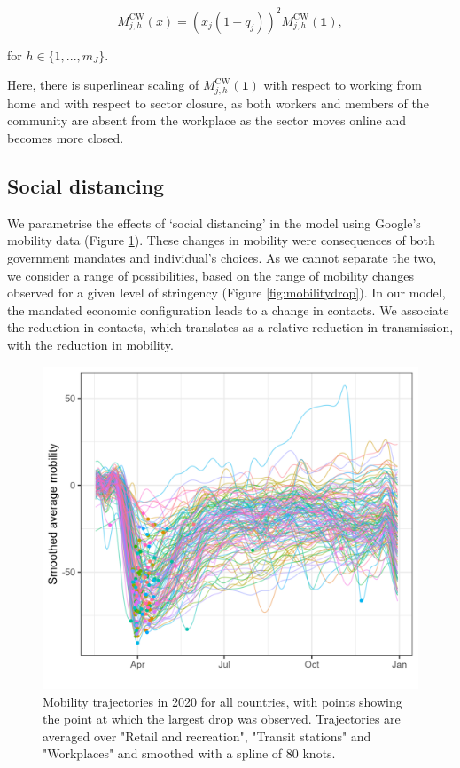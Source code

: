 \documentclass[
]{article}
\begin{document}
\begin{equation}
M_{j,h}^{\text{CW}}(x) = (x_{j}(1-q_j))^2M_{j,h}^{\text{CW}}(\textbf{1}),
\label{eq:ctow}
\end{equation}

for \(h\in\{1,...,m_J\}\).

Here, there is superlinear scaling of \(M^{\text{CW}}_{j,h}(\textbf{1})\) with respect to working from home and with respect to sector closure, as both workers and members of the community are absent from the workplace as the sector moves online and becomes more closed.

\hypertarget{social-distancing}{%
\subsection{Social distancing}\label{social-distancing}}

We parametrise the effects of `social distancing' in the model using Google's mobility data (Figure \ref{fig:smoothmobility}). These changes in mobility were consequences of both government mandates and individual's choices. As we cannot separate the two, we consider a range of possibilities, based on the range of mobility changes observed for a given level of stringency (Figure \ref{fig:mobilitydrop}). In our model, the mandated economic configuration leads to a change in contacts. We associate the reduction in contacts, which translates as a relative reduction in transmission, with the reduction in mobility.

\begin{figure}
\includegraphics[width=39.01in]{README_files/figure-gfm/smoothmobility} \caption{Mobility trajectories in 2020 for all countries, with points showing the point at which the largest drop was observed. Trajectories are averaged over "Retail and recreation", "Transit stations" and "Workplaces" and smoothed with a spline of 80 knots.}\label{fig:smoothmobility}
\end{figure}
\end{document}
